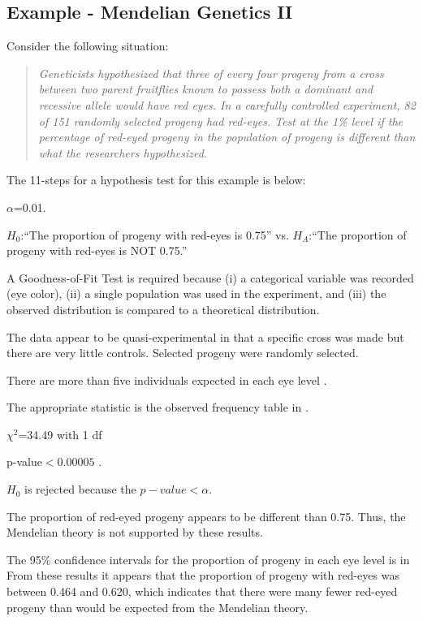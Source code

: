 \documentclass[10pt,openany]{book}\usepackage[]{graphicx}\usepackage[]{color}
\begin{document}
\subsection{Example - Mendelian Genetics II}
\vspace{-12pt}
Consider the following situation:
\begin{quote}
\textsl{Geneticists hypothesized that three of every four progeny from a cross between two parent fruitflies known to possess both a dominant and recessive allele would have red eyes.  In a carefully controlled experiment, 82 of 151 randomly selected progeny had red-eyes.  Test at the 1\% level if the percentage of red-eyed progeny in the population of progeny is different than what the researchers hypothesized.}
\end{quote}



The 11-steps  for a hypothesis test for this example is below:
\vspace{-12pt}
\begin{Enumerate}
  \item $\alpha$=0.01.
  \item $H_{0}$:``The proportion of progeny with red-eyes is 0.75'' vs. $H_{A}$:``The proportion of progeny with red-eyes is NOT 0.75.''
  \item A Goodness-of-Fit Test is required because (i) a categorical variable was recorded (eye color), (ii) a single population was used in the experiment, and (iii) the observed distribution is compared to a theoretical distribution.
  \item The data appear to be quasi-experimental in that a specific cross was made but there are very little controls.  Selected progeny were randomly selected.
  \item There are more than five individuals expected in each eye level .
  \item The appropriate statistic is the observed frequency table in .
  \item $\chi^2$=34.49 with 1 df 
  \item p-value$<0.00005$ .
  \item $H_{0}$ is rejected because the $p-value<\alpha$.
  \item The proportion of red-eyed progeny appears to be different than 0.75.  Thus, the Mendelian theory is not supported by these results.
  \item The 95\% confidence intervals for the proportion of progeny in each eye level is in  From these results it appears that the proportion of progeny with red-eyes was between 0.464 and 0.620, which indicates that there were many fewer red-eyed progeny than would be expected from the Mendelian theory.
\end{Enumerate}
\end{document}
